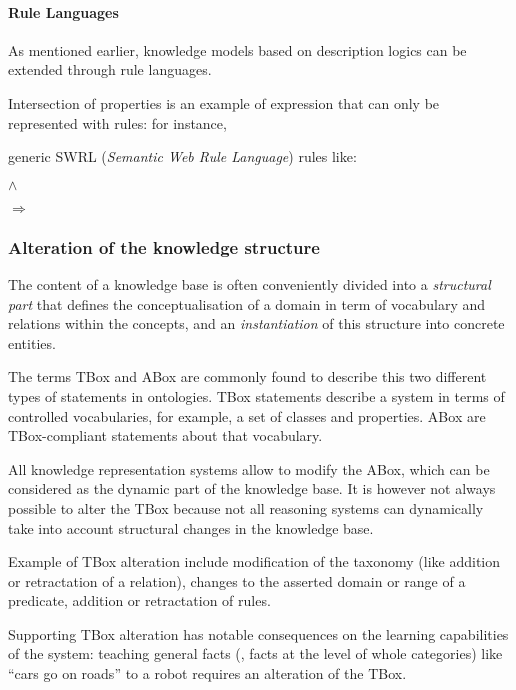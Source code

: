 \paragraph{Rule Languages}

As mentioned earlier, knowledge models based on description logics can be extended through rule languages.

Intersection of properties is an example of expression that can only be represented with rules: for instance, 

generic SWRL ({\em Semantic Web Rule Language}) rules like: \par
        \footnotesize {} $\land$
         \par $\Rightarrow$ 
        \normalsize 


\subsubsection{Alteration of the knowledge structure}

The content of a knowledge base is often conveniently divided into a
\emph{structural part} that defines the conceptualisation of a domain in term
of vocabulary and relations within the concepts, and an \emph{instantiation} of
this structure into concrete entities.

The terms TBox and ABox are commonly found to describe this two different types of
statements in ontologies. TBox statements describe a system in terms of
controlled vocabularies, for example, a set of classes and properties. ABox are
TBox-compliant statements about that vocabulary.

All knowledge representation systems allow to modify the ABox, which can be
considered as the dynamic part of the knowledge base. It is however not always
possible to alter the TBox because not all reasoning systems can dynamically
take into account structural changes in the knowledge base.

Example of TBox alteration include modification of the taxonomy (like addition
or retractation of a  relation), changes to the asserted
domain or range of a predicate, addition or retractation of rules.

Supporting TBox alteration has notable consequences on the learning
capabilities of the system: teaching general facts (\ie, facts at the level of
whole categories) like ``cars go on roads'' to a robot requires an alteration
of the TBox.

